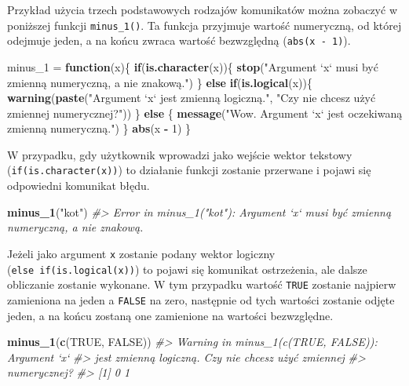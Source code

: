 \documentclass[paper=6in:9in,pagesize=pdftex,headinclude=on,footinclude=on,10pt]{scrbook}
\newenvironment{Shaded}{\begin{snugshade}}{\end{snugshade}}
\newcommand{\CommentTok}[1]{\textcolor[rgb]{0.56,0.35,0.01}{\textit{#1}}}
\newcommand{\ControlFlowTok}[1]{\textcolor[rgb]{0.13,0.29,0.53}{\textbf{#1}}}
\newcommand{\DecValTok}[1]{\textcolor[rgb]{0.00,0.00,0.81}{#1}}
\newcommand{\KeywordTok}[1]{\textcolor[rgb]{0.13,0.29,0.53}{\textbf{#1}}}
\newcommand{\NormalTok}[1]{#1}
\newcommand{\OperatorTok}[1]{\textcolor[rgb]{0.81,0.36,0.00}{\textbf{#1}}}
\newcommand{\OtherTok}[1]{\textcolor[rgb]{0.56,0.35,0.01}{#1}}
\newcommand{\StringTok}[1]{\textcolor[rgb]{0.31,0.60,0.02}{#1}}
\begin{document}
Przykład użycia trzech podstawowych rodzajów komunikatów można zobaczyć w poniższej funkcji \texttt{minus\_1()}.
Ta funkcja przyjmuje wartość numeryczną, od której odejmuje jeden, a na końcu zwraca wartość bezwzględną (\texttt{abs(x\ -\ 1)}).

\begin{Shaded}
\begin{Highlighting}[]
\NormalTok{minus_}\DecValTok{1}\NormalTok{ =}\StringTok{ }\ControlFlowTok{function}\NormalTok{(x)\{}
  \ControlFlowTok{if}\NormalTok{(}\KeywordTok{is.character}\NormalTok{(x))\{}
    \KeywordTok{stop}\NormalTok{(}\StringTok{"Argument `x` musi być zmienną numeryczną, a nie znakową."}\NormalTok{)}
\NormalTok{  \} }\ControlFlowTok{else} \ControlFlowTok{if}\NormalTok{(}\KeywordTok{is.logical}\NormalTok{(x))\{}
    \KeywordTok{warning}\NormalTok{(}\KeywordTok{paste}\NormalTok{(}\StringTok{"Argument `x` jest zmienną logiczną."}\NormalTok{,}
                  \StringTok{"Czy nie chcesz użyć zmiennej numerycznej?"}\NormalTok{))}
\NormalTok{  \} }\ControlFlowTok{else}\NormalTok{ \{}
    \KeywordTok{message}\NormalTok{(}\StringTok{"Wow. Argument `x` jest oczekiwaną zmienną numeryczną."}\NormalTok{)}
\NormalTok{  \}}
  \KeywordTok{abs}\NormalTok{(x }\OperatorTok{-}\StringTok{ }\DecValTok{1}\NormalTok{)}
\NormalTok{\}}
\end{Highlighting}
\end{Shaded}

W przypadku, gdy użytkownik wprowadzi jako wejście wektor tekstowy (\texttt{if(is.character(x))}) to działanie funkcji zostanie przerwane i pojawi się odpowiedni komunikat błędu.

\begin{Shaded}
\begin{Highlighting}[]
\KeywordTok{minus_1}\NormalTok{(}\StringTok{"kot"}\NormalTok{)}
\CommentTok{#> Error in minus_1("kot"): Argument `x` musi być zmienną numeryczną, a nie znakową.}
\end{Highlighting}
\end{Shaded}

Jeżeli jako argument \texttt{x} zostanie podany wektor logiczny (\texttt{else\ if(is.logical(x))}) to pojawi się komunikat ostrzeżenia, ale dalsze obliczanie zostanie wykonane.
W tym przypadku wartość \texttt{TRUE} zostanie najpierw zamieniona na jeden a \texttt{FALSE} na zero, następnie od tych wartości zostanie odjęte jeden, a na końcu zostaną one zamienione na wartości bezwzględne.

\begin{Shaded}
\begin{Highlighting}[]
\KeywordTok{minus_1}\NormalTok{(}\KeywordTok{c}\NormalTok{(}\OtherTok{TRUE}\NormalTok{, }\OtherTok{FALSE}\NormalTok{))}
\CommentTok{#> Warning in minus_1(c(TRUE, FALSE)): Argument `x`}
\CommentTok{#> jest zmienną logiczną. Czy nie chcesz użyć zmiennej}
\CommentTok{#> numerycznej?}
\CommentTok{#> [1] 0 1}
\end{Highlighting}
\end{Shaded}
\end{document}
